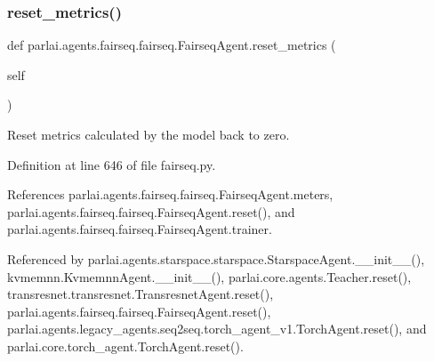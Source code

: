 \subsubsection{\texorpdfstring{reset\+\_\+metrics()}{reset\_metrics()}}
{\footnotesize\ttfamily def parlai.\+agents.\+fairseq.\+fairseq.\+Fairseq\+Agent.\+reset\+\_\+metrics (\begin{DoxyParamCaption}\item[{}]{self }\end{DoxyParamCaption})}

\begin{DoxyVerb}Reset metrics calculated by the model back to zero.\end{DoxyVerb}
 

Definition at line 646 of file fairseq.\+py.



References parlai.\+agents.\+fairseq.\+fairseq.\+Fairseq\+Agent.\+meters, parlai.\+agents.\+fairseq.\+fairseq.\+Fairseq\+Agent.\+reset(), and parlai.\+agents.\+fairseq.\+fairseq.\+Fairseq\+Agent.\+trainer.



Referenced by parlai.\+agents.\+starspace.\+starspace.\+Starspace\+Agent.\+\_\+\+\_\+init\+\_\+\+\_\+(), kvmemnn.\+Kvmemnn\+Agent.\+\_\+\+\_\+init\+\_\+\+\_\+(), parlai.\+core.\+agents.\+Teacher.\+reset(), transresnet.\+transresnet.\+Transresnet\+Agent.\+reset(), parlai.\+agents.\+fairseq.\+fairseq.\+Fairseq\+Agent.\+reset(), parlai.\+agents.\+legacy\+\_\+agents.\+seq2seq.\+torch\+\_\+agent\+\_\+v1.\+Torch\+Agent.\+reset(), and parlai.\+core.\+torch\+\_\+agent.\+Torch\+Agent.\+reset().

